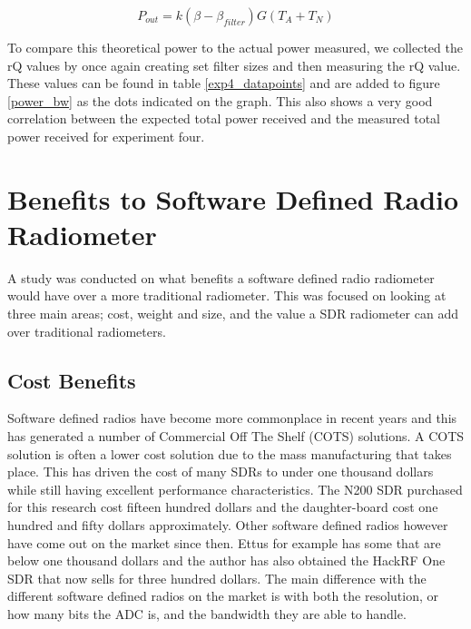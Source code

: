 {\begin{equation}\label{PWR_FILTER}
P_{out}=k (\beta - \beta_{filter})G(T_{A}+T_{N})
\end{equation}

To compare this theoretical power to the actual power measured, we collected the rQ values by once again creating set filter sizes and then measuring the rQ value.  These values can be found in table \ref{exp4_datapoints} and are added to figure \ref{power_bw} as the dots indicated on the graph.  This also shows a very good correlation between the expected total power received and the measured total power received for experiment four.


\section{Benefits to Software Defined Radio Radiometer}
A study was conducted on what benefits a software defined radio radiometer would have over a more traditional radiometer.  This was focused on looking at three main areas; cost, weight and size, and the value a SDR radiometer can add over traditional radiometers.

\subsection{Cost Benefits}
Software defined radios have become more commonplace in recent years and this has generated a number of Commercial Off The Shelf (COTS) solutions.  A COTS solution is often a lower cost solution due to the mass manufacturing that takes place.  This has driven the cost of many SDRs to under one thousand dollars while still having excellent performance characteristics.  The N200 SDR purchased for this research cost fifteen hundred dollars and the daughter-board cost one hundred and fifty dollars approximately.  Other software defined radios however have come out on the market since then.  Ettus for example has some that are below one thousand dollars and the author has also obtained the HackRF One SDR that now sells for three hundred dollars.  The main difference with the different software defined radios on the market is with both the resolution, or how many bits the ADC is, and the bandwidth they are able to handle.

}
